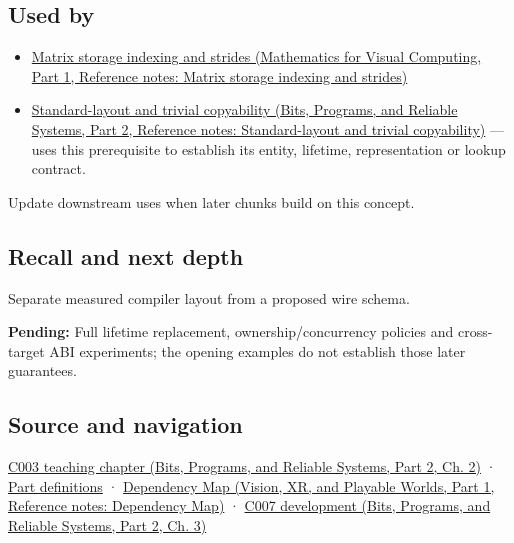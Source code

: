 \subsection{Used by}\label{appendix-c4ac6bb0fff8-used-by}

\hypertarget{appendix-c4ac6bb0fff8-used-by}{}

\begin{itemize}
\item
  \href{../02-Mathematics-for-Visual-Computing-P01/main.pdf\#appendix-ffdc1d4e5350}{Matrix storage indexing and strides (Mathematics for Visual Computing, Part 1, Reference notes: Matrix storage indexing and strides)}
\item
  \href{../01-Bits-Programs-and-Reliable-Systems-P02/main.pdf\#appendix-958870a64c53}{Standard-layout and trivial copyability (Bits, Programs, and Reliable Systems, Part 2, Reference notes: Standard-layout and trivial copyability)} --- uses this prerequisite to establish its entity, lifetime, representation or lookup contract.
\end{itemize}

Update downstream uses when later chunks build on this concept.

\subsection{Recall and next depth}\label{appendix-c4ac6bb0fff8-recall-and-next-depth}

\hypertarget{appendix-c4ac6bb0fff8-recall-and-next-depth}{}

Separate measured compiler layout from a proposed wire schema.

\textbf{Pending:} Full lifetime replacement, ownership/concurrency policies and cross-target ABI experiments; the opening examples do not establish those later guarantees.

\subsection{Source and navigation}\label{appendix-c4ac6bb0fff8-source-and-navigation}

\hypertarget{appendix-c4ac6bb0fff8-source-and-navigation}{}

\href{../01-Bits-Programs-and-Reliable-Systems-P02/main.pdf\#01-foundations-i-ch002-where-the-bytes-live}{C003 teaching chapter (Bits, Programs, and Reliable Systems, Part 2, Ch. 2)} · \hyperref[appendix-fd090d982a15-m003---parts-41-60]{Part definitions} · \href{../07-Vision-XR-and-Playable-Worlds-P01/main.pdf\#appendix-4ad47bdd269a}{Dependency Map (Vision, XR, and Playable Worlds, Part 1, Reference notes: Dependency Map)} · \href{../01-Bits-Programs-and-Reliable-Systems-P02/main.pdf\#01-foundations-i-ch003-bringing-the-object-model-back-to-bytes}{C007 development (Bits, Programs, and Reliable Systems, Part 2, Ch. 3)}
